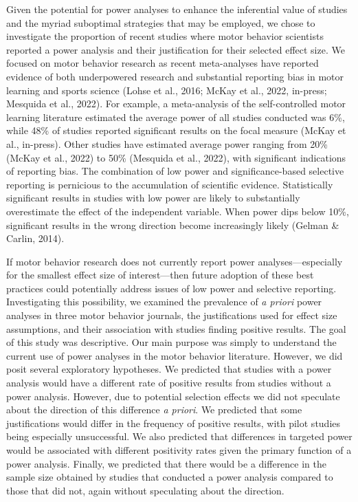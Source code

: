 \documentclass[
  man, donotrepeattitle,mask,floatsintext]{apa7}
\begin{document}
Given the potential for power analyses to enhance the inferential value of studies and the myriad suboptimal strategies that may be employed, we chose to investigate the proportion of recent studies where motor behavior scientists reported a power analysis and their justification for their selected effect size. We focused on motor behavior research as recent meta-analyses have reported evidence of both underpowered research and substantial reporting bias in motor learning and sports science (Lohse et al., 2016; McKay et al., 2022, in-press; Mesquida et al., 2022). For example, a meta-analysis of the self-controlled motor learning literature estimated the average power of all studies conducted was 6\%, while 48\% of studies reported significant results on the focal measure (McKay et al., in-press). Other studies have estimated average power ranging from 20\% (McKay et al., 2022) to 50\% (Mesquida et al., 2022), with significant indications of reporting bias. The combination of low power and significance-based selective reporting is pernicious to the accumulation of scientific evidence. Statistically significant results in studies with low power are likely to substantially overestimate the effect of the independent variable. When power dips below 10\%, significant results in the wrong direction become increasingly likely (Gelman \& Carlin, 2014).

If motor behavior research does not currently report power analyses---especially for the smallest effect size of interest---then future adoption of these best practices could potentially address issues of low power and selective reporting. Investigating this possibility, we examined the prevalence of \emph{a priori} power analyses in three motor behavior journals, the justifications used for effect size assumptions, and their association with studies finding positive results. The goal of this study was descriptive. Our main purpose was simply to understand the current use of power analyses in the motor behavior literature. However, we did posit several exploratory hypotheses. We predicted that studies with a power analysis would have a different rate of positive results from studies without a power analysis. However, due to potential selection effects we did not speculate about the direction of this difference \emph{a priori}. We predicted that some justifications would differ in the frequency of positive results, with pilot studies being especially unsuccessful. We also predicted that differences in targeted power would be associated with different positivity rates given the primary function of a power analysis. Finally, we predicted that there would be a difference in the sample size obtained by studies that conducted a power analysis compared to those that did not, again without speculating about the direction.
\end{document}
